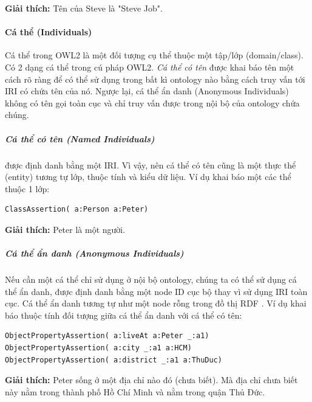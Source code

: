 \textbf{Giải thích:} Tên của Steve là "Steve Job".

\paragraph{Cá thể (Individuals)}
Cá thể trong OWL2 là một đối tượng cụ thể thuộc một tập/lớp (domain/class). Có 2 dạng cá thể trong cú pháp OWL2. \textit{Cá thể có tên} được khai báo tên một cách rõ ràng để có thể sử dụng trong bất kì ontology nào bằng cách truy vấn tới IRI có chứa tên của nó. Ngược lại, cá thể ẩn danh (Anonymous Individuals) không có tên gọi toàn cục và chỉ truy vấn được trong nội bộ của ontology chứa chúng.

\subparagraph{Cá thể có tên (Named Individuals)} được định danh bằng một IRI. Vì vậy, nên cá thể có tên cũng là một thực thể (entity) tương tự lớp, thuộc tính và kiểu dữ liệu. Ví dụ khai báo một các thể thuộc 1 lớp:


\begin{verbatim}
ClassAssertion( a:Person a:Peter)
\end{verbatim}


\textbf{Giải thích:} Peter là một người.

\subparagraph{Cá thể ẩn danh (Anonymous Individuals)} Nếu cần một cá thể chỉ sử dụng ở nội bộ ontology, chúng ta có thể sử dụng cá thể ẩn danh, được định danh bằng một node ID cục bộ thay vì sử dụng IRI toàn cục. Cá thể ẩn danh tương tự như một node rỗng trong đồ thị RDF \cite{rdf_concept}. Ví dụ khai báo thuộc tính đối tượng giữa cá thể ẩn danh với cá thể có tên:

\begin{verbatim}
ObjectPropertyAssertion( a:liveAt a:Peter _:a1)
ObjectPropertyAssertion( a:city _:a1 a:HCM)
ObjectPropertyAssertion( a:district _:a1 a:ThuDuc)
\end{verbatim}

\textbf{Giải thích:} Peter sống ở một địa chỉ nào đó (chưa biết). Mà địa chỉ chưa biết này nằm trong thành phố Hồ Chí Minh và nằm trong quận Thủ Đức.

